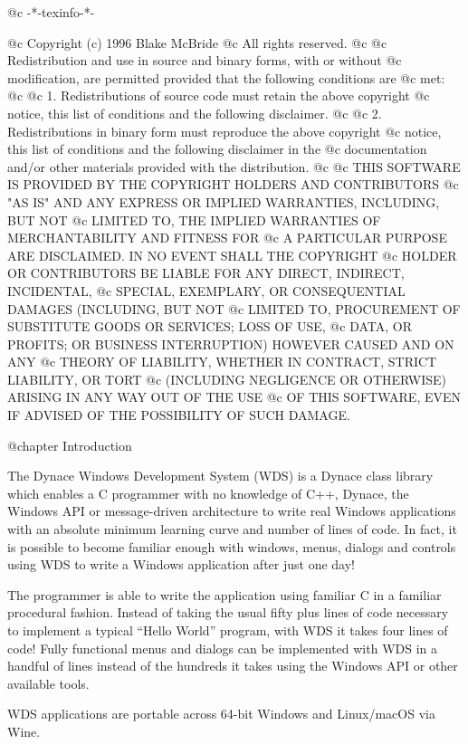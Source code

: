 @c -*-texinfo-*-

@c  Copyright (c) 1996 Blake McBride
@c  All rights reserved.
@c
@c  Redistribution and use in source and binary forms, with or without
@c  modification, are permitted provided that the following conditions are
@c  met:
@c
@c  1. Redistributions of source code must retain the above copyright
@c  notice, this list of conditions and the following disclaimer.
@c
@c  2. Redistributions in binary form must reproduce the above copyright
@c  notice, this list of conditions and the following disclaimer in the
@c  documentation and/or other materials provided with the distribution.
@c
@c  THIS SOFTWARE IS PROVIDED BY THE COPYRIGHT HOLDERS AND CONTRIBUTORS
@c  "AS IS" AND ANY EXPRESS OR IMPLIED WARRANTIES, INCLUDING, BUT NOT
@c  LIMITED TO, THE IMPLIED WARRANTIES OF MERCHANTABILITY AND FITNESS FOR
@c  A PARTICULAR PURPOSE ARE DISCLAIMED. IN NO EVENT SHALL THE COPYRIGHT
@c  HOLDER OR CONTRIBUTORS BE LIABLE FOR ANY DIRECT, INDIRECT, INCIDENTAL,
@c  SPECIAL, EXEMPLARY, OR CONSEQUENTIAL DAMAGES (INCLUDING, BUT NOT
@c  LIMITED TO, PROCUREMENT OF SUBSTITUTE GOODS OR SERVICES; LOSS OF USE,
@c  DATA, OR PROFITS; OR BUSINESS INTERRUPTION) HOWEVER CAUSED AND ON ANY
@c  THEORY OF LIABILITY, WHETHER IN CONTRACT, STRICT LIABILITY, OR TORT
@c  (INCLUDING NEGLIGENCE OR OTHERWISE) ARISING IN ANY WAY OUT OF THE USE
@c  OF THIS SOFTWARE, EVEN IF ADVISED OF THE POSSIBILITY OF SUCH DAMAGE.

@chapter Introduction

The Dynace Windows Development System (WDS) is a Dynace class library
which enables a C programmer with no knowledge of C++, Dynace, the
Windows API or message-driven architecture to write real Windows
applications with an absolute minimum learning curve and number of
lines of code.  In fact, it is possible to become familiar enough with
windows, menus, dialogs and controls using WDS to write a Windows
application after just one day!

The programmer is able to write the application using familiar C in a
familiar procedural fashion.  Instead of taking the usual fifty plus
lines of code necessary to implement a typical ``Hello World'' program,
with WDS it takes four lines of code!  Fully functional menus and
dialogs can be implemented with WDS in a handful of lines instead of the
hundreds it takes using the Windows API or other available tools.

WDS applications are portable across 64-bit Windows and Linux/macOS
via Wine.


